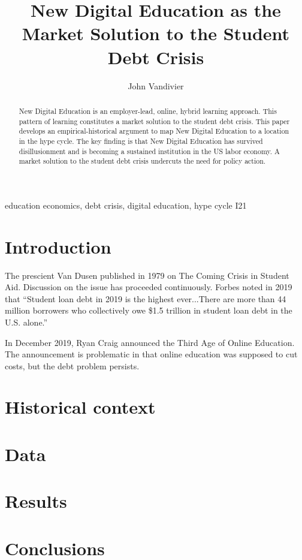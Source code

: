 \documentclass[review]{elsarticle}
\begin{document}
\begin{frontmatter}

\title{
    New Digital Education as the Market Solution to the Student Debt Crisis
}


\author[mymainaddress]{John Vandivier}
\address[mymainaddress]{4400 University Dr, Fairfax, VA 22030}

\begin{abstract}
    New Digital Education is an employer-lead, online, hybrid learning approach.
    This pattern of learning constitutes a market solution to the student debt crisis.
    This paper develops an empirical-historical argument to map New Digital Education
    to a location in the hype cycle. The key finding is that New Digital Education
    has survived disillusionment and is becoming a sustained institution in the US labor economy.
    A market solution to the student debt crisis undercuts the need for policy action.
\end{abstract}

\begin{keyword}
education economics, debt crisis, digital education, hype cycle
\MSC[2010] I21 %
\end{keyword}

\end{frontmatter}

\pagebreak
\linenumbers
        
    \section{Introduction}
    The prescient Van Dusen published in 1979 on The Coming Crisis in Student Aid\cite{van1979coming}.
    Discussion on the issue has proceeded continuously.
    Forbes noted in 2019\cite{friedman2018student} that “Student loan
    debt in 2019 is the highest ever...There are more than 44 million borrowers
    who collectively owe \$1.5 trillion in student loan debt in the U.S.
    alone.”


    In December 2019, Ryan Craig announced the Third Age of Online Education.
    The announcement is problematic in that online education was supposed to cut costs, but the debt problem persists.

    \section{Historical context}
    \section{Data}

    \section{Results}
    \section{Conclusions}

    

    
\end{document}
